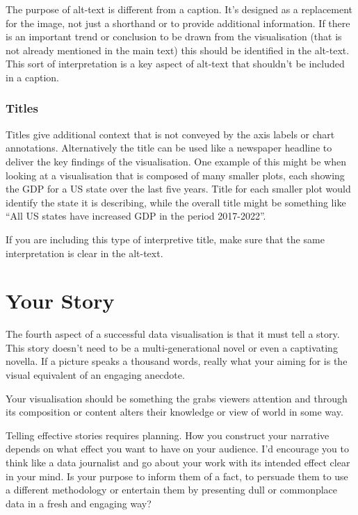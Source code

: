 \documentclass[
  letterpaper,
  DIV=11,
  numbers=noendperiod]{scrreprt}
\begin{document}
The purpose of alt-text is different from a caption. It's designed as a
replacement for the image, not just a shorthand or to provide additional
information. If there is an important trend or conclusion to be drawn
from the visualisation (that is not already mentioned in the main text)
this should be identified in the alt-text. This sort of interpretation
is a key aspect of alt-text that shouldn't be included in a caption.

\subsubsection{Titles}\label{titles}

Titles give additional context that is not conveyed by the axis labels
or chart annotations. Alternatively the title can be used like a
newspaper headline to deliver the key findings of the visualisation. One
example of this might be when looking at a visualisation that is
composed of many smaller plots, each showing the GDP for a US state over
the last five years. Title for each smaller plot would identify the
state it is describing, while the overall title might be something like
``All US states have increased GDP in the period 2017-2022''.

If you are including this type of interpretive title, make sure that the
same interpretation is clear in the alt-text.

\section{Your Story 📖}\label{your-story}

The fourth aspect of a successful data visualisation is that it must
tell a story. This story doesn't need to be a multi-generational novel
or even a captivating novella. If a picture speaks a thousand words,
really what your aiming for is the visual equivalent of an engaging
anecdote.

Your visualisation should be something the grabs viewers attention and
through its composition or content alters their knowledge or view of
world in some way.

Telling effective stories requires planning. How you construct your
narrative depends on what effect you want to have on your audience. I'd
encourage you to think like a data journalist and go about your work
with its intended effect clear in your mind. Is your purpose to inform
them of a fact, to persuade them to use a different methodology or
entertain them by presenting dull or commonplace data in a fresh and
engaging way?
\end{document}
